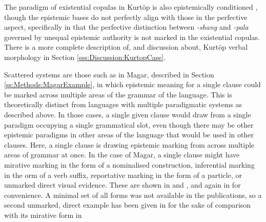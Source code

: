 The paradigm of existential copulas in Kurtöp is also epistemically conditioned \cite{Hyslop2014}, though the epistemic bases do not perfectly align with those in the perfective aspect, specifically in that the perfective distinction between \textit{-shang} and \textit{-pala} governed by unequal epistemic authority is not marked in the existential copulas. There is a more complete description of, and discussion about, Kurtöp verbal morphology in Section \ref{sss:Discussion:KurtopCase}.

Scattered systems are those such as in Magar, described in Section \ref{ss:Methods:MagarExample}, in which epistemic meaning for a single clause could be marked across multiple areas of the grammar of the language. This is theoretically distinct from languages with multiple paradigmatic systems as described above. In those cases, a single given clause would draw from a single paradigm occupying a single grammatical slot, even though there may be other epistemic paradigms in other areas of the language that would be used in other clauses. Here, a single clause is drawing epistemic marking from across multiple areas of grammar at once. In the case of Magar, a single clause might have mirative marking in the form of a nominalised construction, inferential marking in the orm of a verb suffix, reportative marking in the form of a particle, or unmarked direct visual evidence. These are shown in  and , and again in  for convenience. A minimal set of all forms was not available in the publications, so a second unmarked, direct example has been given in  for the sake of comparison with its mirative form in 

